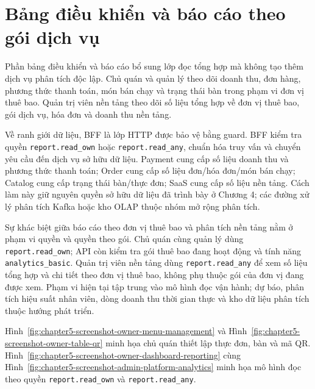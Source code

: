 
\section{Bảng điều khiển và báo cáo theo gói dịch vụ}

Phần bảng điều khiển và báo cáo bổ sung lớp đọc tổng hợp mà không tạo thêm dịch vụ phân tích độc lập. Chủ quán và quản lý theo dõi doanh thu, đơn hàng, phương thức thanh toán, món bán chạy và trạng thái bàn trong phạm vi đơn vị thuê bao. Quản trị viên nền tảng theo dõi số liệu tổng hợp về đơn vị thuê bao, gói dịch vụ, hóa đơn và doanh thu nền tảng.

Về ranh giới dữ liệu, BFF là lớp HTTP được bảo vệ bằng guard. BFF kiểm tra quyền \texttt{report.read\_own} hoặc \texttt{report.read\_any}, chuẩn hóa truy vấn và chuyển yêu cầu đến dịch vụ sở hữu dữ liệu. Payment cung cấp số liệu doanh thu và phương thức thanh toán; Order cung cấp số liệu đơn/hóa đơn/món bán chạy; Catalog cung cấp trạng thái bàn/thực đơn; SaaS cung cấp số liệu nền tảng. Cách làm này giữ nguyên quyền sở hữu dữ liệu đã trình bày ở Chương 4; các đường xử lý phân tích Kafka hoặc kho OLAP thuộc nhóm mở rộng phân tích.

Sự khác biệt giữa báo cáo theo đơn vị thuê bao và phân tích nền tảng nằm ở phạm vi quyền và quyền theo gói. Chủ quán cùng quản lý dùng \texttt{report.read\_own}; API còn kiểm tra gói thuê bao đang hoạt động và tính năng \texttt{analytics\_basic}. Quản trị viên nền tảng dùng \texttt{report.read\_any} để xem số liệu tổng hợp và chi tiết theo đơn vị thuê bao, không phụ thuộc gói của đơn vị đang được xem. Phạm vi hiện tại tập trung vào mô hình đọc vận hành; dự báo, phân tích hiệu suất nhân viên, dòng doanh thu thời gian thực và kho dữ liệu phân tích thuộc hướng phát triển.

Hình~\ref{fig:chapter5-screenshot-owner-menu-management} và Hình~\ref{fig:chapter5-screenshot-owner-table-qr} minh họa chủ quán thiết lập thực đơn, bàn và mã QR. Hình~\ref{fig:chapter5-screenshot-owner-dashboard-reporting} cùng Hình~\ref{fig:chapter5-screenshot-admin-platform-analytics} minh họa mô hình đọc theo quyền \texttt{report.read\_own} và \texttt{report.read\_any}.


